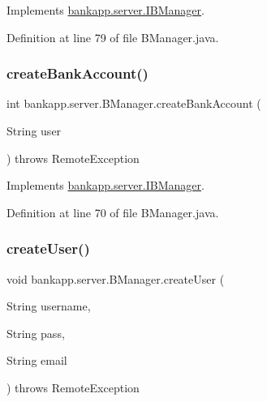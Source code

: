 Implements \hyperlink{interfacebankapp_1_1server_1_1_i_b_manager_a31f275bed15b74bb2bc6ef43ede7f7f8}{bankapp.\+server.\+I\+B\+Manager}.



Definition at line 79 of file B\+Manager.\+java.

\mbox{\label{classbankapp_1_1server_1_1_b_manager_abf7716d220d573ad491f4ee15312aaff}} 
\subsubsection{\texorpdfstring{create\+Bank\+Account()}{createBankAccount()}}
{\footnotesize\ttfamily int bankapp.\+server.\+B\+Manager.\+create\+Bank\+Account (\begin{DoxyParamCaption}\item[{String}]{user }\end{DoxyParamCaption}) throws Remote\+Exception}



Implements \hyperlink{interfacebankapp_1_1server_1_1_i_b_manager_aeb423a1ba2348fdaa7d1466a907e82e1}{bankapp.\+server.\+I\+B\+Manager}.



Definition at line 70 of file B\+Manager.\+java.

\mbox{\label{classbankapp_1_1server_1_1_b_manager_ad98f4af0b4ae0842a58570e6c08a371c}} 
\subsubsection{\texorpdfstring{create\+User()}{createUser()}}
{\footnotesize\ttfamily void bankapp.\+server.\+B\+Manager.\+create\+User (\begin{DoxyParamCaption}\item[{String}]{username,  }\item[{String}]{pass,  }\item[{String}]{email }\end{DoxyParamCaption}) throws Remote\+Exception}



